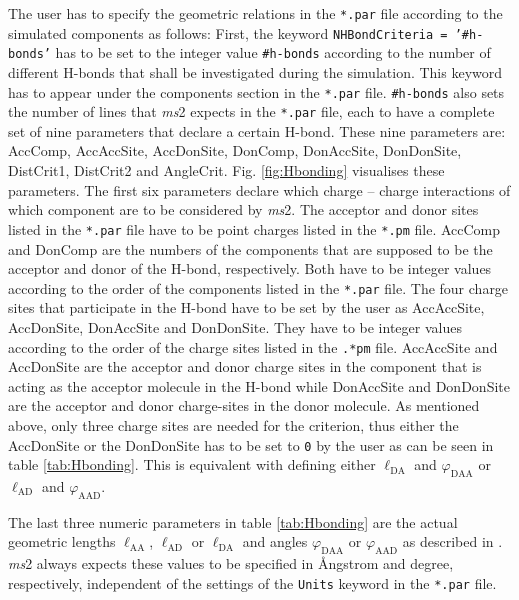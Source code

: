 The user has to specify the geometric relations in the \texttt{*.par} file according to the simulated components as follows: First, the keyword \texttt{NHBondCriteria = '\#h-bonds'} has to be set to the integer value \texttt{\#h-bonds} according to the number of different H-bonds that shall be investigated during the simulation. This keyword has to appear under the components section in the \texttt{*.par} file. \texttt{\#h-bonds} also sets the number of lines that \textit{ms}2 expects in the \texttt{*.par} file, each to have a complete set of nine parameters that declare a certain H-bond. These nine parameters are:\\
AccComp, AccAccSite, AccDonSite, DonComp, DonAccSite, DonDonSite, DistCrit1, DistCrit2 and AngleCrit. 
Fig. \ref{fig:Hbonding} visualises these parameters. The first six parameters declare which charge -- charge interactions of which component are to be considered by \textit{ms}2. The acceptor and donor sites listed in the \texttt{*.par} file have to be point charges listed in the \texttt{*.pm} file. AccComp and DonComp are the numbers of the components that are supposed to be the acceptor and donor of the H-bond, respectively. Both have to be integer values according to the order of the components listed in the \texttt{*.par} file. The four charge sites that participate in the H-bond have to be set by the user as AccAccSite, AccDonSite, DonAccSite and DonDonSite. They have to be integer values according to the order of the charge sites listed in the \texttt{.*pm} file. AccAccSite and AccDonSite are the acceptor and donor charge sites in the component that is acting as the acceptor molecule in the H-bond while DonAccSite and DonDonSite are the acceptor and donor charge-sites in the donor molecule. As mentioned above, only three charge sites are needed for the criterion, thus either the AccDonSite or the DonDonSite has to be set to \texttt{0} by the user as can be seen in table \ref{tab:Hbonding}. This is equivalent with defining either $\ell_\mathrm{DA}$ and $\varphi_\mathrm{DAA}$ or $\ell_\mathrm{AD}$ and $\varphi_\mathrm{AAD}$.

The last three numeric parameters in table \ref{tab:Hbonding} are the actual geometric lengths $\ell_\mathrm{AA}$, $\ell_\mathrm{AD}$ or $\ell_\mathrm{DA}$ and angles $\varphi_\mathrm{DAA}$ or $\varphi_\mathrm{AAD}$ as described in \parencite{Haughney1987}. \textit{ms}2 always expects these values to be specified in \AA ngstrom and degree, respectively, independent of the settings of the \texttt{Units} keyword in the \texttt{*.par} file.

